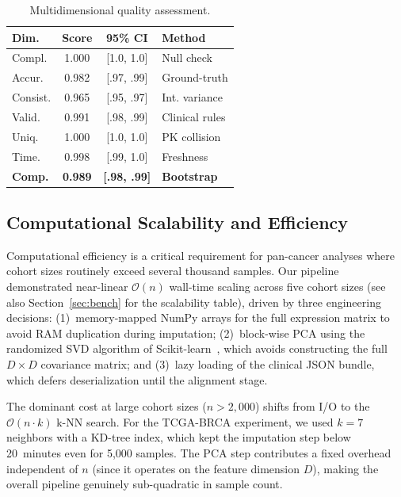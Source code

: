 \documentclass[twocolumn]{article}
\begin{document}
\begin{table}[H]
\caption{Multidimensional quality assessment.}\label{tab:quality}
\centering
\scriptsize
\renewcommand{\arraystretch}{1.1}
\setlength{\tabcolsep}{2pt}
\begin{tabularx}{\columnwidth}{l C C L}
\toprule
\textbf{Dim.} & \textbf{Score} & \textbf{95\% CI} & \textbf{Method} \\
\midrule
Compl.    & 1.000 & [1.0, 1.0] & Null check \\
Accur.    & 0.982 & [.97, .99] & Ground-truth \\
Consist.  & 0.965 & [.95, .97] & Int. variance \\
Valid.    & 0.991 & [.98, .99] & Clinical rules \\
Uniq.     & 1.000 & [1.0, 1.0] & PK collision \\
Time.     & 0.998 & [.99, 1.0] & Freshness \\
\midrule
\textbf{Comp.} & \textbf{0.989} & \textbf{[.98, .99]} & \textbf{Bootstrap} \\
\bottomrule
\end{tabularx}
\end{table}

\subsection{Computational Scalability and Efficiency}
Computational efficiency is a critical requirement for pan-cancer analyses where cohort sizes routinely exceed several thousand samples. Our pipeline demonstrated near-linear $\mathcal{O}(n)$ wall-time scaling across five cohort sizes (see also Section~\ref{sec:bench} for the scalability table), driven by three engineering decisions: (1)~memory-mapped NumPy arrays for the full expression matrix to avoid RAM duplication during imputation; (2)~block-wise PCA using the randomized SVD algorithm of Scikit-learn~\cite{pedregosa2011}, which avoids constructing the full $D \times D$ covariance matrix; and (3)~lazy loading of the clinical JSON bundle, which defers deserialization until the alignment stage.

The dominant cost at large cohort sizes ($n > 2{,}000$) shifts from I/O to the $\mathcal{O}(n \cdot k)$ k-NN search. For the TCGA-BRCA experiment, we used $k=7$ neighbors with a KD-tree index, which kept the imputation step below 20~minutes even for 5,000 samples. The PCA step contributes a fixed overhead independent of $n$ (since it operates on the feature dimension $D$), making the overall pipeline genuinely sub-quadratic in sample count.
\end{document}
